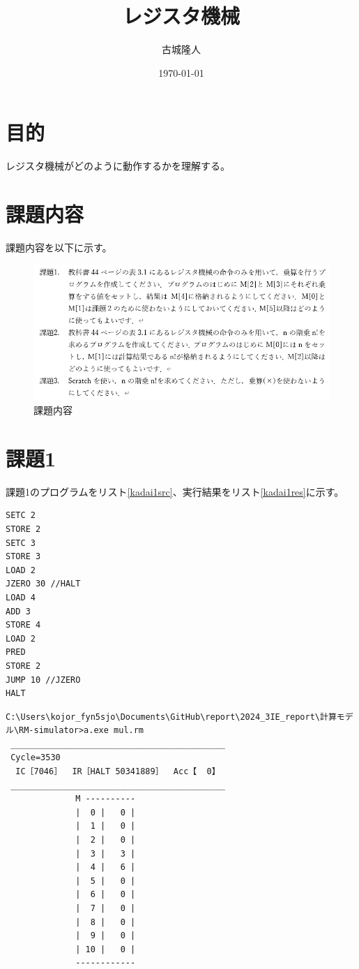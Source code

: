 \documentclass[a4paper,11pt]{ltjsarticle}
\begin{document}
\title{レジスタ機械}
\author{古城隆人}
\date{\today}
\maketitle
\newpage
\section{目的}
レジスタ機械がどのように動作するかを理解する。
\section{課題内容}
課題内容を以下に示す。
\begin{figure}[htbp]
    \centering
    \includegraphics[width = \columnwidth]{./image/image.png}
    \caption{課題内容}
    \label{fig:kadai}
\end{figure}
\section{課題1}
課題1のプログラムをリスト\ref{kadai1src}、実行結果をリスト\ref{kadai1res}に示す。
\begin{lstlisting}[caption = 課題1のプログラム,label = kadai1src]
SETC 2
STORE 2
SETC 3
STORE 3
LOAD 2
JZERO 30 //HALT
LOAD 4
ADD 3
STORE 4
LOAD 2
PRED
STORE 2
JUMP 10 //JZERO
HALT
\end{lstlisting}
\begin{lstlisting}[caption = 課題1の実行結果,label = kadai1res]
  C:\Users\kojor_fyn5sjo\Documents\GitHub\report\2024_3IE_report\計算モデル\RM-simulator>a.exe mul.rm
 ___________________________________________
 Cycle=3530
  IC［7046］  IR［HALT 50341889］  Acc【  0】
 ___________________________________________ 
              M ----------
              |  0 |   0 |
              |  1 |   0 |
              |  2 |   0 |
              |  3 |   3 |
              |  4 |   6 |
              |  5 |   0 |
              |  6 |   0 |
              |  7 |   0 |
              |  8 |   0 |
              |  9 |   0 |
              | 10 |   0 |
              ------------

\end{lstlisting}
\end{document}
